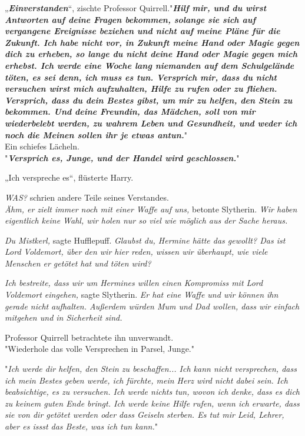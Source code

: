 {„\textbf{\emph{Einverstanden}}“, zischte Professor Quirrell."\textbf{\emph{Hilf mir, und du wirst Antworten auf deine Fragen bekommen, solange sie sich auf vergangene Ereignisse beziehen und nicht auf meine Pläne für die Zukunft. Ich habe nicht vor, in Zukunft meine Hand oder Magie gegen dich zu erheben, so lange du nicht deine Hand oder Magie gegen mich erhebst. Ich werde eine Woche lang niemanden auf dem Schulgelände töten, es sei denn, ich muss es tun. Versprich mir, dass du nicht versuchen wirst mich aufzuhalten, Hilfe zu rufen oder zu fliehen. Versprich, dass du dein Bestes gibst, um mir zu helfen, den Stein zu bekommen. Und deine Freundin, das Mädchen, soll von mir wiederbelebt werden, zu wahrem Leben und Gesundheit, und weder ich noch die Meinen sollen ihr je etwas antun.}}"\\ Ein schiefes Lächeln.\\ "\textbf{\emph{Versprich es, Junge, und der Handel wird geschlossen.}}"

„Ich verspreche es“, flüsterte Harry.

\emph{WAS?} schrien andere Teile seines Verstandes.\\ \emph{Ähm, er zielt immer noch mit einer Waffe auf uns,} betonte Slytherin. \emph{Wir haben eigentlich keine Wahl, wir holen nur so viel wie möglich aus der Sache heraus.}

\emph{Du Mistkerl,} sagte Hufflepuff. \emph{Glaubst du, Hermine hätte das gewollt? Das ist Lord Voldemort, über den wir hier reden, wissen wir überhaupt, wie viele Menschen er getötet hat und töten wird?}

\emph{Ich bestreite, dass wir um Hermines willen einen Kompromiss mit Lord Voldemort eingehen,} sagte Slytherin. \emph{Er hat eine Waffe und wir können ihn gerade nicht} \emph{aufhalten. Außerdem würden Mum und Dad wollen, dass wir einfach mitgehen und in Sicherheit sind.}

Professor Quirrell betrachtete ihn unverwandt.\\ "Wiederhole das volle Versprechen in Parsel, Junge."

"\emph{Ich werde dir helfen, den Stein zu beschaffen... Ich kann nicht versprechen, dass ich mein Bestes geben werde, ich fürchte, mein Herz wird nicht dabei sein. Ich beabsichtige, es zu versuchen. Ich werde nichts tun, wovon ich denke, dass es dich zu keinem guten Ende bringt. Ich werde keine Hilfe rufen, wenn ich erwarte, dass sie von dir getötet werden oder dass Geiseln sterben. Es tut mir Leid, Lehrer, aber es issst das Beste, was ich tun kann.}"

}
